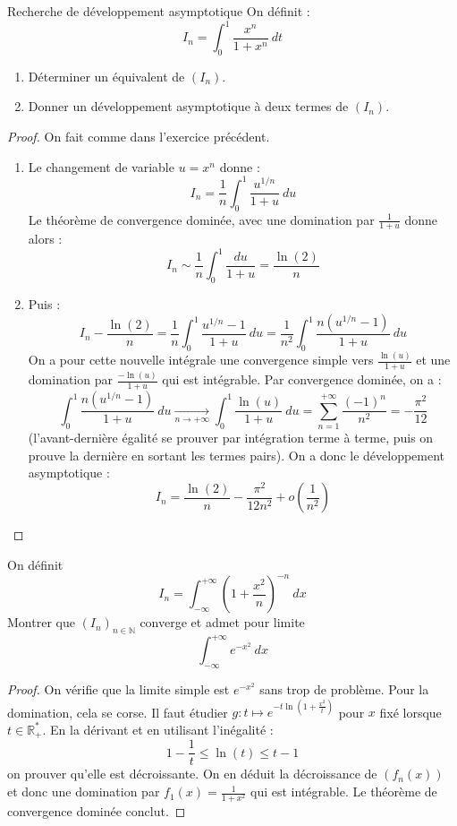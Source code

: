 \documentclass[french,a4paper]{article}
\newcommand{\N}{\mathbb{N}}
\newcommand{\R}{\mathbb{R}}
\newcommand{\st}{^*}
\theoremstyle{plain}
\theoremstyle{definition}
\theoremstyle{remark}
\begin{document}
\begin{ex}[Moulin.IP.03]{Recherche de développement asymptotique}
	On définit : $$I_n=\int_{0}^{1}\frac{x^n}{1+x^n}\ dt$$
	\begin{enumerate}
		\item Déterminer un équivalent de $(I_n)$.
		\item Donner un développement asymptotique à deux termes de $(I_n)$.
	\end{enumerate}
\end{ex}
\begin{proof}
	On fait comme dans l'exercice précédent.
	\begin{enumerate}
		\item Le changement de variable $u=x^n$ donne : $$I_n=\frac{1}{n}\int_{0}^{1}\frac{u^{1/n}}{1+u}\ du$$ Le théorème de convergence dominée, avec une domination par $\displaystyle\frac{1}{1+u}$ donne alors : $$I_n\sim\frac{1}{n}\int_{0}^{1}\frac{du}{1+u}=\frac{\ln(2)}{n}$$
		\item Puis : $$I_n-\frac{\ln(2)}{n}=\frac{1}{n}\int_{0}^{1}\frac{u^{1/n}-1}{1+u}\ du=\frac{1}{n^2}\int_{0}^{1}\frac{n(u^{1/n}-1)}{1+u}\ du$$ On a pour cette nouvelle intégrale une convergence simple vers $\displaystyle\frac{\ln(u)}{1+u}$ et une domination par $\displaystyle\frac{-\ln(u)}{1+u}$ qui est intégrable. Par convergence dominée, on a : $$\int_{0}^{1}\frac{n(u^{1/n}-1)}{1+u}\ du\xrightarrow[n\to+\infty]{}\int_{0}^{1}\frac{\ln(u)}{1+u}\ du=\sum_{n=1}^{+\infty}\frac{(-1)^n}{n^2}=-\frac{\pi^2}{12}$$ (l'avant-dernière égalité se prouver par intégration terme à terme, puis on prouve la dernière en sortant les termes pairs). On a donc le développement asymptotique : $$I_n=\frac{\ln(2)}{n}-\frac{\pi^2}{12n^2}+o\left(\frac{1}{n^2}\right)$$
	\end{enumerate}
\end{proof}

\begin{ex}[Moulin.IP.04]{}
	On définit $$I_n=\int_{-\infty}^{+\infty}\left(1+\frac{x^2}{n}\right)^{-n}\ dx$$ Montrer que $(I_n)_{n\in\N}$ converge et admet pour limite $$\int_{-\infty}^{+\infty}e^{-x^2}\ dx$$
\end{ex}
\begin{proof}
	On vérifie que la limite simple est $e^{-x^2}$ sans trop de problème. Pour la domination, cela se corse. Il faut étudier $g:t\mapsto\displaystyle e^{-t\ln\left(1+\frac{x^2}{t}\right)}$ pour $x$ fixé lorsque $t\in\R_+\st$. En la dérivant et en utilisant l'inégalité : $$1-\frac{1}{t}\leqslant\ln(t)\leqslant t-1$$ on prouver qu'elle est décroissante. On en déduit la décroissance de $(f_n(x))$ et donc une domination par $f_1(x)=\displaystyle\frac{1}{1+x^2}$ qui est intégrable. Le théorème de convergence dominée conclut.
\end{proof}
\end{document}
